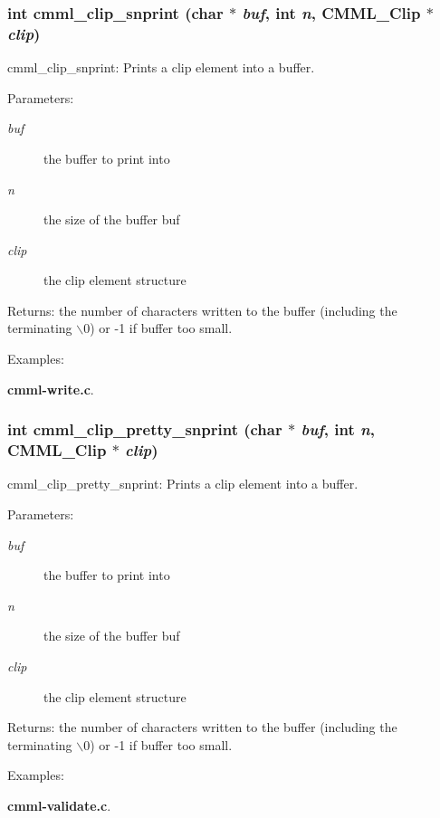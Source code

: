 \subsubsection{\setlength{\rightskip}{0pt plus 5cm}int cmml\_\-clip\_\-snprint (char $\ast$ {\em buf}, int {\em n}, {\bf CMML\_\-Clip} $\ast$ {\em clip})}\label{cmml_8h_a79}


cmml\_\-clip\_\-snprint: Prints a clip element into a buffer.

\begin{Desc}
\item[Parameters:]
\begin{description}
\item[{\em buf}]the buffer to print into \item[{\em n}]the size of the buffer buf \item[{\em clip}]the clip element structure\end{description}
\end{Desc}
\begin{Desc}
\item[Returns:]the number of characters written to the buffer (including the terminating $\backslash$0) or -1 if buffer too small. \end{Desc}
\begin{Desc}
\item[Examples: ]\par
{\bf cmml-write.c}.\end{Desc}
\subsubsection{\setlength{\rightskip}{0pt plus 5cm}int cmml\_\-clip\_\-pretty\_\-snprint (char $\ast$ {\em buf}, int {\em n}, {\bf CMML\_\-Clip} $\ast$ {\em clip})}\label{cmml_8h_a80}


cmml\_\-clip\_\-pretty\_\-snprint: Prints a clip element into a buffer.

\begin{Desc}
\item[Parameters:]
\begin{description}
\item[{\em buf}]the buffer to print into \item[{\em n}]the size of the buffer buf \item[{\em clip}]the clip element structure\end{description}
\end{Desc}
\begin{Desc}
\item[Returns:]the number of characters written to the buffer (including the terminating $\backslash$0) or -1 if buffer too small. \end{Desc}
\begin{Desc}
\item[Examples: ]\par
{\bf cmml-validate.c}.\end{Desc}
